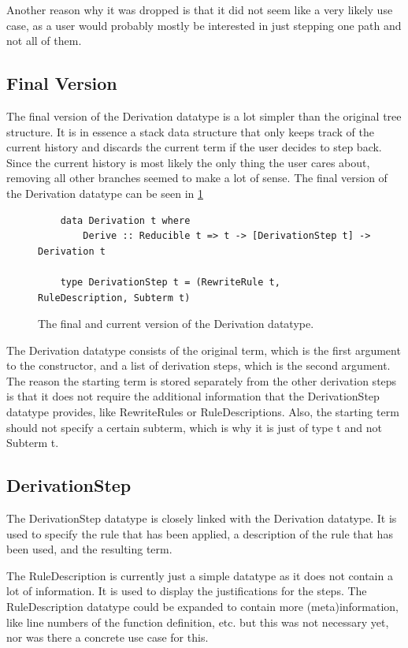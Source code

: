 Another reason why it was dropped is that it did not seem like a very likely use case,
as a user would probably mostly be interested in just stepping one path and not all of them.

\subsection{Final Version}

The final version of the Derivation datatype is a lot simpler than the original tree structure.
It is in essence a stack data structure that only keeps track of the current history and discards the current term if the user decides to step back.
Since the current history is most likely the only thing the user cares about,
removing all other branches seemed to make a lot of sense.
The final version of the Derivation datatype can be seen in \ref*{fig:finalDerivation}

\begin{figure}[!ht]
    \begin{verbatim}
    data Derivation t where
        Derive :: Reducible t => t -> [DerivationStep t] -> Derivation t
    
    type DerivationStep t = (RewriteRule t, RuleDescription, Subterm t)
    \end{verbatim}
    \caption{The final and current version of the Derivation datatype.}
    \label{fig:finalDerivation}
\end{figure}

The Derivation datatype consists of the original term,
which is the first argument to the constructor,
and a list of derivation steps,
which is the second argument.
The reason the starting term is stored separately from the other derivation steps
is that it does not require the additional information that the DerivationStep datatype provides,
like RewriteRules or RuleDescriptions.
Also,
the starting term should not specify a certain subterm,
which is why it is just of type t and not Subterm t.

\subsection{DerivationStep}
The DerivationStep datatype is closely linked with the Derivation datatype.
It is used to specify the rule that has been applied,
a description of the rule that has been used,
and the resulting term.

The RuleDescription is currently just a simple datatype as it does not contain a lot of information.
It is used to display the justifications for the steps.
The RuleDescription datatype could be expanded to contain more (meta)information,
like line numbers of the function definition, etc.
but this was not necessary yet, nor was there a concrete use case for this.

